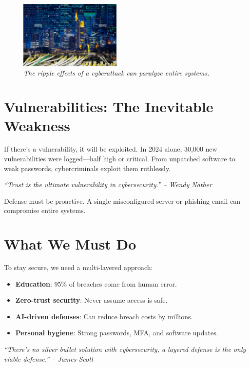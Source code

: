 \documentclass[a4paper,10pt,twocolumn]{memoir}
\newenvironment{magquote}
  {\begin{shaded*}\itshape\small}
  {\end{shaded*}}
\begin{document}
\begin{figure}[h]
  \centering
  \includegraphics[width=0.45\textwidth]{city.png}
  \caption{\textit{The ripple effects of a cyberattack can paralyze entire systems.}}
\end{figure}

\section*{Vulnerabilities: The Inevitable Weakness}
If there's a vulnerability, it will be exploited. In 2024 alone, 30,000 new vulnerabilities were logged—half high or critical. From unpatched software to weak passwords, cybercriminals exploit them ruthlessly.

\begin{magquote}
``Trust is the ultimate vulnerability in cybersecurity.'' -- Wendy Nather
\end{magquote}

Defense must be proactive. A single misconfigured server or phishing email can compromise entire systems.

\section*{What We Must Do}
To stay secure, we need a multi-layered approach:

\begin{itemize}
  \item \textbf{Education}: 95\% of breaches come from human error.
  \item \textbf{Zero-trust security}: Never assume access is safe.
  \item \textbf{AI-driven defenses}: Can reduce breach costs by millions.
  \item \textbf{Personal hygiene}: Strong passwords, MFA, and software updates.
\end{itemize}

\begin{magquote}
``There's no silver bullet solution with cybersecurity, a layered defense is the only viable defense.'' -- James Scott
\end{magquote}
\end{document}
